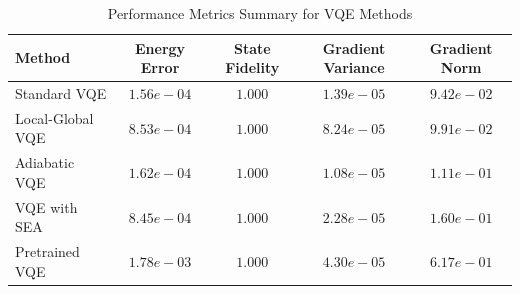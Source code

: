 \begin{table}[h!]
\centering
\caption{Performance Metrics Summary for VQE Methods}
\label{tab:performance_metrics}
\begin{tabular}{lcccc}
\hline
\textbf{Method} & \textbf{Energy Error} & \textbf{State Fidelity} & \textbf{Gradient Variance} & \textbf{Gradient Norm} \\
\hline
Standard VQE & $1.56e-04$ & $1.000$ & $1.39e-05$ & $9.42e-02$ \\
Local-Global VQE & $8.53e-04$ & $1.000$ & $8.24e-05$ & $9.91e-02$ \\
Adiabatic VQE & $1.62e-04$ & $1.000$ & $1.08e-05$ & $1.11e-01$ \\
VQE with SEA & $8.45e-04$ & $1.000$ & $2.28e-05$ & $1.60e-01$ \\
Pretrained VQE & $1.78e-03$ & $1.000$ & $4.30e-05$ & $6.17e-01$ \\
\hline
\end{tabular}
\end{table}